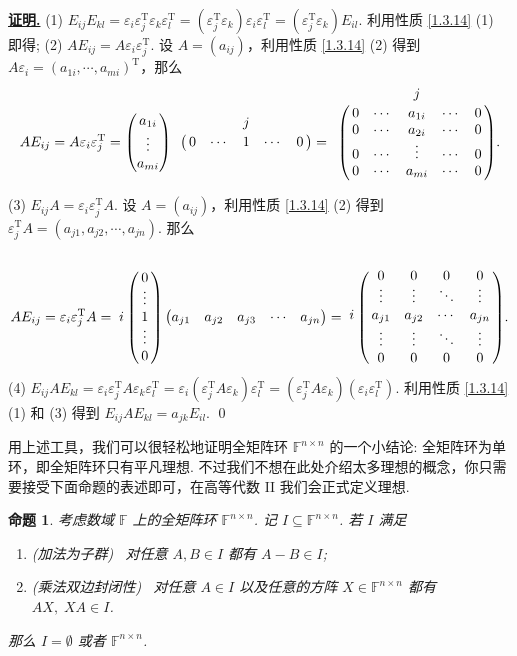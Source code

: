 \documentclass[10pt,openany]{article}
\theoremstyle{thmstyle} %
\theoremstyle{defstyle} %
\theoremstyle{prostyle} %
\newtheorem{proposition}[theorem]{命题}
\theoremstyle{exastyle}
\theoremstyle{remstyle}
\renewenvironment{proof}[1][证明]{\par\underline{\textbf{#1.}} \;\fangsong}{\qed\par}
\newcommand{\T}{^{\text{T}}}
\newcommand{\F}{\mathbb{F}}
\begin{document}
\begin{proof}
	(1) \( E_{ij}E_{kl}= \varepsilon_i\varepsilon_j\T\varepsilon_k\varepsilon_l\T= (\varepsilon_j\T\varepsilon_k)\varepsilon_i\varepsilon_l\T =(\varepsilon_j\T\varepsilon_k)E_{il} \). 利用性质 \ref{1.3.14} (1) 即得; (2) \( AE_{ij}=A\varepsilon_i\varepsilon_j\T \).  设 \( A=(a_{ij}) \)，利用性质 \ref{1.3.14} (2) 得到 \( A\varepsilon_i=(a_{1i},\cdots,a_{mi})\T \)，那么
	\[ AE_{ij}=A\varepsilon_i\varepsilon_j\T= \begin{pmatrix}
		a_{1i} \\ \vdots \\ a_{mi}
	\end{pmatrix}\bordermatrix{
	& & & j & & \cr
	& 0 & \cdots & 1 & \cdots & 0 
	}= \bordermatrix{
	& & & j & & \cr
	& 0 & \cdots & a_{1i} & \cdots & 0 \cr
	& 0 & \cdots & a_{2i} & \cdots & 0 \cr
	& 0 & \cdots & \vdots & \cdots & 0 \cr
	& 0 & \cdots & a_{mi} & \cdots & 0 \cr
	}. \]
	
	(3) \( E_{ij}A=\varepsilon_i\varepsilon_j\T A \). 设 \( A=(a_{ij}) \)，利用性质 \ref{1.3.14} (2) 得到 \( \varepsilon_j\T A=(a_{j1},a_{j2},\cdots,a_{jn}) \). 那么
	\[ AE_{ij}=\varepsilon_i\varepsilon_j\T A= \bordermatrix{
		&  \cr
		& 0  \cr
		& \vdots \cr
		i & 1 \cr
		& \vdots \cr
		& 0 
	} \begin{pmatrix}
	a_{j1} & a_{j2} & a_{j3} & \cdots & a_{jn}
	\end{pmatrix}
	= \bordermatrix{
		& & &  &  \cr
		& 0 & 0 & 0 & 0   \cr
		& \vdots & \vdots & \ddots & \vdots \cr
	  i	& a_{j1} & a_{j2} & \cdots  & a_{jn}  \cr
		& \vdots & \vdots & \ddots & \vdots  \cr
		& 0& 0& 0 &0  \cr
	}. \]
	(4) \( E_{ij}AE_{kl} =\varepsilon_i\varepsilon_j\T A\varepsilon_k\varepsilon_l\T=\varepsilon_i(\varepsilon_j\T A\varepsilon_k)\varepsilon_l\T=(\varepsilon_j\T A\varepsilon_k)(\varepsilon_i\varepsilon_l\T) \). 利用性质 \ref{1.3.14} (1) 和 (3) 得到 \( E_{ij}AE_{kl} =a_{jk}E_{il} \).
\end{proof}


用上述工具，我们可以很轻松地证明全矩阵环 \( \F^{n \times n} \) 的一个小结论: 全矩阵环为单环，即全矩阵环只有平凡理想. 不过我们不想在此处介绍太多理想的概念，你只需要接受下面命题的表述即可，在高等代数 II 我们会正式定义理想. 

\begin{proposition}
	考虑数域 \( \F \) 上的全矩阵环 \( \F^{n \times n} \). 记 \( I \subseteq \F^{n \times n} \). 若 \( I \) 满足
	\begin{enumerate}[(1)]
		\item (加法为子群) \ 对任意 \( A,B \in I \) 都有 \( A-B \in I \);
		\item (乘法双边封闭性) \ 对任意 \( A  \in I \) 以及任意的方阵 \( X \in \F^{n \times n} \) 都有 \( AX, \; XA \in I \).
	\end{enumerate}
	
	那么 \( I= \emptyset \) 或者 \( \F^{n \times n} \).
\end{proposition}
\end{document}
